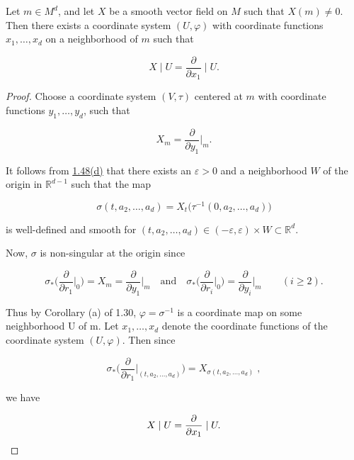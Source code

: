 \begin{proposition}\label{thm:1.53}
	Let $m \in M^{d}$, and let $X$ be a smooth vector field on $M$ such that $X(m) \neq 0$. Then there exists a coordinate system $(U, \varphi)$ with coordinate functions $x_{1}, \ldots, x_{d}$ on a neighborhood of $m$ such that

	\begin{equation}
		\tag{1}\label{eq:1.53:1}
		X\mid U=\frac{\partial}{\partial x_{1}}\mid U.
	\end{equation}

\end{proposition}

\begin{proof}
	Choose a coordinate system $(V,\tau)$ centered at $m$ with coordinate functions $y_{1},\ldots,y_{d}$, such that

	\begin{equation}
		\tag{2}\label{eq:1.53:2}
		X_{m}=\frac{\partial}{\partial y_{1}}\Big|_{m}.
	\end{equation}

	It follows from \hyperref[thm:1.48]{1.48(d)} that there exists an $\varepsilon>0$ and a neighborhood $W$ of the origin in $\mathbb{R}^{d-1}$ such that the map

	\[
		\sigma(t,a_{2},\ldots,a_{d})=X_{t}\big(\tau^{-1}(0,a_{2},\ldots,a_{d})\big)
	\]

	is well-defined and smooth for $(t, a_{2}, \ldots, a_{d}) \in (-\varepsilon, \varepsilon) \times W \subset \mathbb{R}^{d}$.

	Now,  $ \sigma $ is non-singular at the origin since

	\[
		\sigma_{*}\bigg(\frac{\partial}{\partial r_{1}}\bigg|_{0}\bigg)=X_{m}=\frac{\partial}{\partial y_{1}}\bigg|_{m}\quad\mathrm{and}\quad \sigma_{*}\bigg(\frac{\partial}{\partial r_{i}}\bigg|_{0}\bigg)=\frac{\partial}{\partial y_{i}}\bigg|_{m}\qquad(i\geq2).
	\]

	Thus by Corollary (a) of 1.30,  $ \varphi = \sigma^{-1} $ is a coordinate map on some neighborhood U of m. Let  $ x_1, \ldots, x_d $ denote the coordinate functions of the coordinate system  $ (U, \varphi) $. Then since

	\[
		\sigma_{*}\bigg(\frac{\partial}{\partial r_{1}}\bigg|_{(t,a_{2},\ldots,a_{d})}\bigg)=X_{\sigma(t,a_{2},\ldots,a_{d})}\;,
	\]

	we have

	\[
		X\mid U=\frac{\partial}{\partial x_{1}}\mid U.
		\qedhere
	\]
\end{proof}

